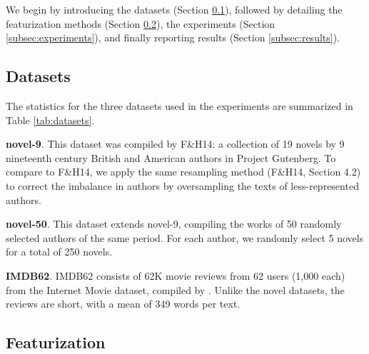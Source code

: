 We begin by introducing the datasets (Section \ref{subsec:datasets}), followed by detailing the featurization methods (Section \ref{subsec:featurization}), the experiments (Section \ref{subsec:experiments}), and finally reporting results (Section \ref{subsec:results}). 

\subsection{Datasets}
\label{subsec:datasets}
The statistics for the three datasets used in the experiments are summarized in Table \ref{tab:datasets}.
\begin{table}
\begin{center}
\vspace{-1.5em}
\caption{Statistics for datasets.}
\label{tab:datasets}
\end{center}
\end{table}
\medskip

\noindent
\textbf{novel-9}.
This dataset was compiled by F\&H14: a collection of 19 novels by 9 nineteenth century British and American authors in Project Gutenberg. To compare to F\&H14, we apply the same resampling method (F\&H14, Section 4.2) to correct the imbalance in authors by oversampling the texts of less-represented authors.
\medskip

\noindent
\textbf{novel-50}.
This dataset extends novel-9, compiling the works of 50 randomly selected authors of the same period. 
For each author, we randomly select 5 novels for a total of 250 novels.
\medskip

\noindent
\textbf{IMDB62}.
IMDB62 consists of 62K movie reviews from 62 users (1,000 each) from the Internet Movie dataset, compiled by . Unlike the novel datasets, the reviews are short, with a mean of 349 words per text.

\subsection{Featurization}
\label{subsec:featurization}

